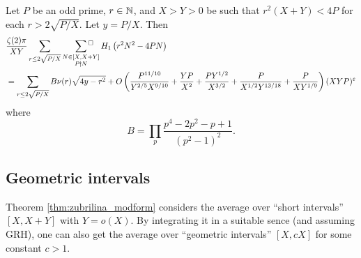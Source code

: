 \begin{proposition}
    Let $P$ be an odd prime, $r \in \mathbb{N}$, and $X > Y > 0$ be such that $r^2(X + Y) < 4 P$ for each $r > 2 \sqrt{P/X}$. Let $y = P/X$. Then
    \begin{align*}
        &\frac{\zeta(2) \pi}{ XY} \sum_{r \le 2 \sqrt{P/X}} \,\,\,\, \sideset{}{{}^\square}\sum_{\substack{N \in [X, X + Y] \\ P \nmid N}}  H_1\left(r^2 N^2 - 4 PN\right) \\
        &= \sum_{r \le 2 \sqrt{P/X}} B\nu(r) \sqrt{4y - r^2} + O\left(\frac{P^{11/10}}{Y^{2/5}X^{9/10}} + \frac{YP}{X^2} + \frac{PY^{1/2}}{X^{3/2}} + \frac{P}{X^{1/2} Y^{13/18}} + \frac{P}{XY^{1/9}}\right) (XYP)^\varepsilon
    \end{align*}
    where
    \[
    B = \prod_p \frac{p^4 - 2p^2 - p + 1}{(p^2 - 1)^2}.
    \]
\end{proposition}

\subsection{Geometric intervals}

Theorem \ref{thm:zubrilina_modform} considers the average over ``short intervals'' $[X, X + Y]$ with $Y = o(X)$.
By integrating it in a suitable sence (and assuming GRH), one can also get the average over ``geometric intervals'' $[X, cX]$ for some constant $c > 1$.

